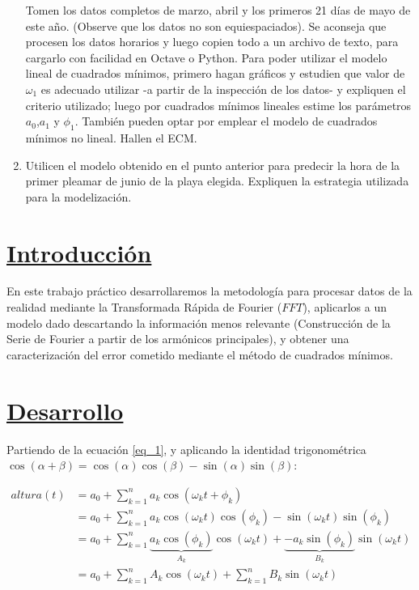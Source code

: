 \documentclass[10pt,a4paper]{article}
\numberwithin{equation}{section}
\numberwithin{figure}{section}
\numberwithin{table}{section}
\begin{document}
\begin{enumerate}
    Tomen los datos completos de marzo, abril y los primeros 21 días de mayo de este año. (Observe que los datos no son equiespaciados). Se aconseja que procesen los datos horarios y luego copien todo a un archivo de texto, para cargarlo con facilidad en Octave o Python.
    Para poder utilizar el modelo lineal de cuadrados mínimos, primero hagan gráficos y estudien que valor de $\omega_1$ es adecuado utilizar -a partir de la inspección de los datos- y expliquen el criterio utilizado; luego por cuadrados mínimos lineales estime los parámetros $a_0$,$a_1$ y $\phi_1$.
    También pueden optar por emplear el modelo de cuadrados mínimos no lineal.
    Hallen el ECM.\\
    
    \item
    Utilicen el modelo obtenido en el punto anterior para predecir la hora de la primer pleamar de junio de la playa elegida. Expliquen la estrategia utilizada para la modelización.
    
\end{enumerate}


\section{\underline{Introducción}}

En este trabajo práctico desarrollaremos la metodología para procesar datos de la realidad mediante la Transformada Rápida de Fourier ($FFT$), 
aplicarlos a un modelo dado descartando la información menos relevante (Construcción de la Serie de Fourier a partir de los armónicos principales), 
y obtener una caracterización del error cometido mediante el método de cuadrados mínimos.


\section{\underline{Desarrollo}}



Partiendo de la ecuación \ref*{eq_1}, y aplicando la identidad trigonométrica $ \cos(\alpha+\beta) = \cos(\alpha)\cos(\beta) - \sin(\alpha)\sin(\beta) $:

\begin{equation}\label{eqn:eq_3}
    \begin{split}
        altura(t) &= a_0 + \sum_{k=1}^{n} a_k \cos(\omega_k t + \phi_k) \\
                  &= a_0 + \sum_{k=1}^{n} a_k  \cos(\omega_k t)\cos(\phi_k) -  \sin(\omega_k t)\sin(\phi_k)  \\
                  &= a_0 + \sum_{k=1}^{n} \underbrace{a_k \cos(\phi_k)}_{A_k} \cos(\omega_k t) + \underbrace{ - a_k \sin(\phi_k)}_{B_k} \sin(\omega_k t) \\
                  &= a_0 + \sum_{k=1}^{n} A_k \cos(\omega_k t)  + \sum_{k=1}^{n} B_k \sin(\omega_k t)
    \end{split}    
\end{equation}
\end{document}
